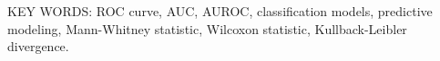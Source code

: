 

\vspace{0.10in}




KEY WORDS: ROC curve, AUC, AUROC, classification models, predictive modeling, Mann-Whitney statistic, Wilcoxon statistic, Kullback-Leibler divergence.




\vspace{0.10in}


